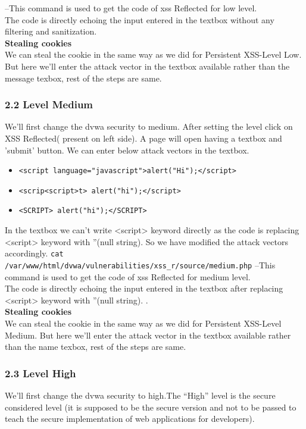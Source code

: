 \documentclass{article}
\begin{document}
  --This command is used to get the code of xss Reflected for low level.\\
The code is directly echoing the input entered in the textbox without any filtering and sanitization.\\
\textbf{Stealing cookies}\\
We can steal the cookie in the same way as we did for Persistent XSS-Level Low. But here we'll enter the attack vector in the textbox available rather than the message texbox, rest of the steps are same.

\subsubsection*{2.2 Level Medium}
We'll first change the dvwa security to medium. After setting the level click on XSS Reflected( present on left side). A page will open having a textbox and 'submit' button. We can enter below attack vectors in the textbox.\\
\begin{itemize}
     \item {\tt <script language="javascript">alert("Hi");</script>}
     \item {\tt <scrip<script>t> alert("hi");</script>}
     \item {\tt <SCRIPT> alert("hi");</SCRIPT>}
\end{itemize}

In the textbox we can't write <script> keyword directly as the code is replacing <script> keyword with ''(null string). So we have modified the attack vectors accordingly.
{\tt cat /var/www/html/dvwa/vulnerabilities/xss\_r/source/medium.php} --This command is used to get the code of xss Reflected for medium level.\\
The code is directly echoing the input entered in the textbox after replacing <script> keyword with ''(null string). .\\
\textbf{Stealing cookies}\\
We can steal the cookie in the same way as we did for Persistent XSS-Level Medium. But here we'll enter the attack vector in the textbox available rather than the name texbox, rest of the steps are same.
\subsubsection*{2.3 Level High}
We'll first change the dvwa security to high.The “High” level is the secure considered level (it is supposed to be the secure version and not to be passed to teach the secure implementation of web applications for developers).
\end{document}
